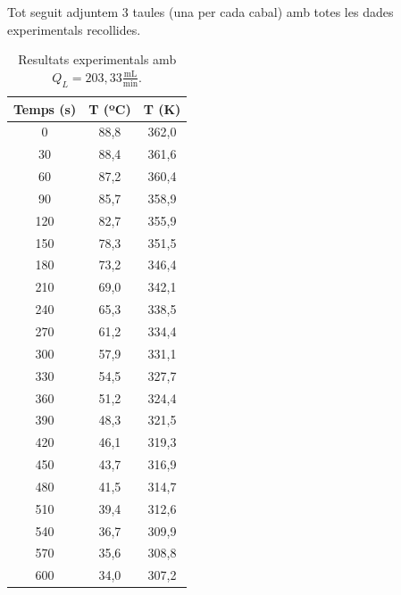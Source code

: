 \documentclass[10pt, twoside]{article}
\begin{document}
Tot seguit adjuntem 3 taules (una per cada cabal) amb totes les dades experimentals recollides.
\begin{table}[H]
    \centering
    \begin{minipage}{0.3\textwidth}
        \centering
        \caption{Resultats experimentals amb $Q_L = 203,33 \frac{\text{mL}}{\text{min}}$.}
        \begin{tabular}{ccc}
            \toprule
            \textbf{Temps (s)} & \textbf{T (ºC)} & \textbf{T (K)} \\
            \midrule
            0   & 88,8 & 362,0 \\
            30  & 88,4 & 361,6 \\
            60  & 87,2 & 360,4 \\
            90  & 85,7 & 358,9 \\
            120 & 82,7 & 355,9 \\
            150 & 78,3 & 351,5 \\
            180 & 73,2 & 346,4 \\
            210 & 69,0 & 342,1 \\
            240 & 65,3 & 338,5 \\
            270 & 61,2 & 334,4 \\
            300 & 57,9 & 331,1 \\
            330 & 54,5 & 327,7 \\
            360 & 51,2 & 324,4 \\
            390 & 48,3 & 321,5 \\
            420 & 46,1 & 319,3 \\
            450 & 43,7 & 316,9 \\
            480 & 41,5 & 314,7 \\
            510 & 39,4 & 312,6 \\
            540 & 36,7 & 309,9 \\
            570 & 35,6 & 308,8 \\
            600 & 34,0 & 307,2 \\
            
            \bottomrule
        \end{tabular}
        

\end{minipage}
\end{table}
\end{document}
